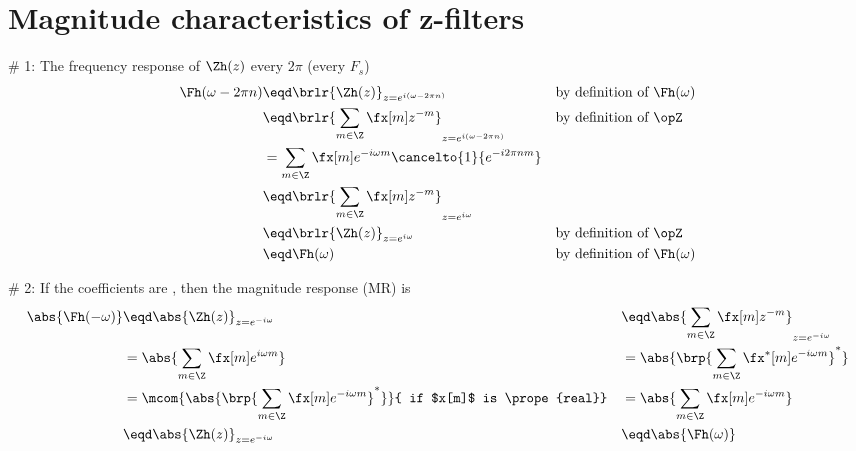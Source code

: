 
\chapter{Magnitude characteristics of z-filters}

\# 1: The frequency response of $\Zh(z)$  every $2\pi$ (every $F_s$)
\begin{align*}
  \Fh(\omega-2\pi n)
    &\eqd \brlr{\Zh(z)}_{z=e^{i(\omega-2\pi n)}}
    && \text{by definition of $\Fh(\omega)$}
  \\&\eqd \brlr{\sum_{m\in\Z} \fx[m] z^{-m}}_{z=e^{i(\omega-2\pi n)}}
    &&\text{by definition of $\opZ$}
  \\&= \sum_{m\in\Z} \fx[m] e^{-i\omega m}\cancelto{1}{e^{-i2\pi nm}}
  \\&\eqd \brlr{\sum_{m\in\Z} \fx[m] z^{-m}}_{z=e^{i\omega}}
  \\&\eqd \brlr{\Zh(z)}_{z=e^{i\omega}}
    &&\text{by definition of $\opZ$}
  \\&\eqd \Fh(\omega)
    && \text{by definition of $\Fh(\omega)$}
\end{align*}

\# 2: If the coefficients are , then the magnitude response (MR) is 
\begin{align*}
  \abs{\Fh(-\omega)}
    &\eqd \abs{\Zh(z)}_{z=e^{-i\omega}}
   &&\eqd \abs{\sum_{m\in\Z} \fx[m] z^{-m}}_{z=e^{-i\omega}}
  \\&= \abs{\sum_{m\in\Z} \fx[m] e^{i\omega m}}
   &&= \abs{\brp{\sum_{m\in\Z} \fx^\ast[m] e^{-i\omega m}}^\ast}
  \\&= \mcom{\abs{\brp{\sum_{m\in\Z} \fx[m] e^{-i\omega m}}^\ast}}
            { if $x[m]$ is \prope{real}}
   &&= \abs{\sum_{m\in\Z} \fx[m] e^{-i\omega m}}
  \\&\eqd \abs{\Zh(z)}_{z=e^{-i\omega}}
   &&\eqd \abs{\Fh(\omega)}
\end{align*}
\mbox{}

